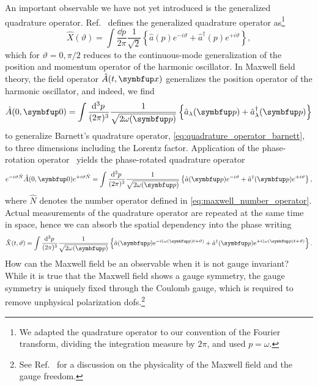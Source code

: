 An important observable we have not yet introduced is the generalized quadrature operator.
Ref.~\cite[p.~79]{Barnett2002} defines the generalized quadrature operator as\footnote{We adapted the quadrature operator to our convention of the Fourier transform, dividing the integration measure by $2\pi$, and used $p=\omega$.}
\begin{equation}
	\hat{X}(\vartheta)
	=
	\int\frac{\dd{p}}{2\pi}
	\frac{1}{\sqrt{2}}
	\left\{
		\hat{a}(p)
		e^{-i\vartheta}
		+
		\hat{a}^\dagger(p)
		e^{+i\vartheta}
	\right\}
	,
	\label{eq:quadrature_operator_barnett}
\end{equation}
which for $\vartheta=0,\pi/2$ reduces to the continuous-mode generalization of the position and momentum operator of the harmonic oscillator.
In Maxwell field theory, the field operator $\hat{A}(t,\vb{x})$ generalizes the position operator of the harmonic oscillator, and indeed, we find
\begin{equation}
	\hat{A}(0,\vb{0})
	=
	\int\frac{\dd[3]{p}}{(2\pi)^3}
	\frac{1}{\sqrt{2\omega(\vb{p})}}
	\left\{
		\hat{a}_\lambda(\vb{p})
		+
		\hat{a}_\lambda^\dagger(\vb{p})
	\right\}
\end{equation}
to generalize Barnett's quadrature operator, \cref{eq:quadrature_operator_barnett}, to three dimensions including the Lorentz factor.
Application of the phase-rotation operator~\cite[p.~38]{Leonhardt2010} yields the phase-rotated quadrature operator
\begin{equation}
	e^{-i\vartheta\hat{N}}
	\hat{A}(0,\vb{0})
	e^{+i\vartheta\hat{N}}
	=
	\int\frac{\dd[3]{p}}{(2\pi)^3}
	\frac{1}{\sqrt{2\omega(\vb{p})}}
	\left\{
		\hat{a}(\vb{p})
		e^{-i\vartheta}
		+
		\hat{a}^\dagger(\vb{p})
		e^{+i\vartheta}
	\right\}
	,
\end{equation}
where $\hat{N}$ denotes the number operator defined in \cref{eq:maxwell_number_operator}.
Actual measurements of the quadrature operator are repeated at the same time in space, hence we can absorb the spatial dependency into the phase writing
\begin{equation}
	\hat{X}(t,\vartheta)
	=
	\int\frac{\dd[3]{p}}{(2\pi)^3}
	\frac{1}{\sqrt{2\omega(\vb{p})}}
	\left\{
		\hat{a}(\vb{p})
		e^{-i(\omega(\vb{p})t+\vartheta)}
		+
		\hat{a}^\dagger(\vb{p})
		e^{+i(\omega(\vb{p})t+\vartheta)}
	\right\}
	.
	\label{eq:quadrature_operator}
\end{equation}
How can the Maxwell field be an observable when it is not gauge invariant?
While it is true that the Maxwell field shows a gauge symmetry, the gauge symmetry is uniquely fixed through the Coulomb gauge, which is required to remove unphysical polarization \gls{dof}s.\footnote{See Ref.~\cite{stackexchange676622} for a discussion on the physicality of the Maxwell field and the gauge freedom.}
